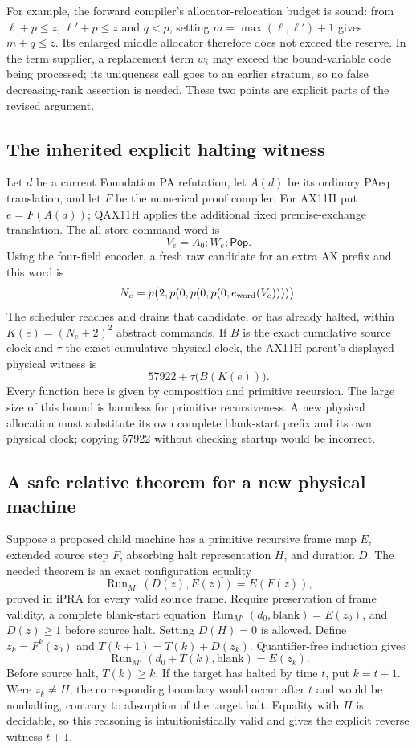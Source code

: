 For example, the forward compiler's allocator-relocation budget is sound:
from $\ell+p\le z$, $\ell'+p\le z$ and $q<p$, setting
$m=\max(\ell,\ell')+1$ gives $m+q\le z$.  Its enlarged middle allocator
therefore does not exceed the reserve.  In the term supplier, a replacement
term $w_i$ may exceed the bound-variable code being processed; its uniqueness
call goes to an earlier stratum, so no false decreasing-rank assertion is
needed.  These two points are explicit parts of the revised argument.

\subsection{The inherited explicit halting witness}

Let $d$ be a current Foundation PA refutation, let $A(d)$ be its ordinary
PAeq translation, and let $F$ be the numerical proof compiler.  For AX11H
put $e=F(A(d))$; QAX11H applies the additional fixed premise-exchange
translation.  The all-store command word is
\[
 V_e=A_0;W_e;\mathsf{Pop}.
\]
Using the four-field encoder, a fresh raw candidate for an extra AX prefix
and this word is
\[
 N_e=p\bigl(2,p(0,p(0,p(0,e_{\rm word}(V_e))))\bigr).
\]
The scheduler reaches and drains that candidate, or has already halted,
within $K(e)=(N_e+2)^2$ abstract commands.  If $B$ is the exact cumulative
source clock and $\tau$ the exact cumulative physical clock, the AX11H
parent's displayed physical witness is
\[
 57922+\tau\bigl(B(K(e))\bigr).
\]
Every function here is given by composition and primitive recursion.  The
large size of this bound is harmless for primitive recursiveness.  A new
physical allocation must substitute its own complete blank-start prefix
and its own physical clock; copying 57922 without checking startup would
be incorrect.

\subsection{A safe relative theorem for a new physical machine}

Suppose a proposed child machine has a primitive recursive frame map $E$,
extended source step $F$, absorbing halt representation $H$, and duration
$D$.  The needed theorem is an exact configuration equality
\[
 \operatorname{Run}_{M'}(D(z),E(z))=E(F(z)),
\]
proved in iPRA for every valid source frame.  Require preservation of frame
validity, a complete blank-start equation
$\operatorname{Run}_{M'}(d_0,\mathrm{blank})=E(z_0)$, and
$D(z)\ge1$ before source halt.  Setting $D(H)=0$ is allowed.
Define $z_k=F^k(z_0)$ and
$T(k+1)=T(k)+D(z_k)$.  Quantifier-free induction gives
\[
 \operatorname{Run}_{M'}(d_0+T(k),\mathrm{blank})=E(z_k).
\]
Before source halt, $T(k)\ge k$.  If the target has halted by time $t$,
put $k=t+1$.  Were $z_k\ne H$, the corresponding boundary would occur
after $t$ and would be nonhalting, contrary to absorption of the target
halt.  Equality with $H$ is decidable, so this reasoning is intuitionistically
valid and gives the explicit reverse witness $t+1$.

